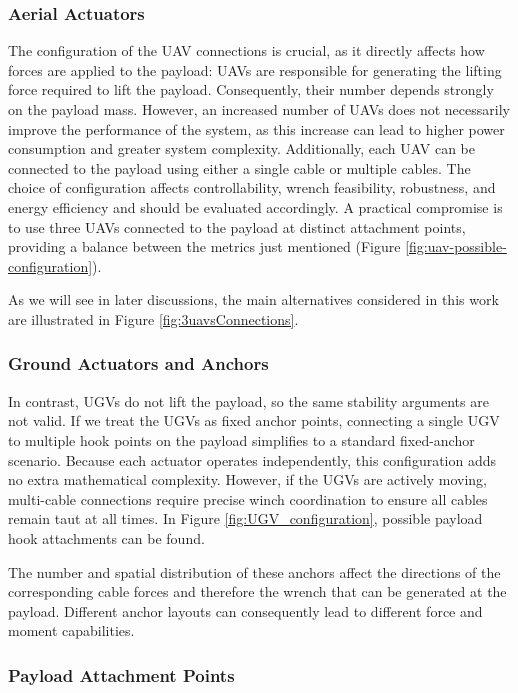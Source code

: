 \subsubsection{Aerial Actuators}

The configuration of the UAV connections is crucial, as it directly affects how forces are applied to the payload: UAVs are responsible for generating the lifting force required to lift the payload. Consequently, their number depends strongly on the payload mass. However, an increased number of UAVs does not necessarily improve the performance of the system, as this increase can lead to higher power consumption and greater system complexity. Additionally, each UAV can be connected to the payload using either a single cable or multiple cables. The choice of configuration affects controllability, wrench feasibility, robustness, and energy efficiency and should be evaluated accordingly. A practical compromise is to use three UAVs connected to the payload at distinct attachment points, providing a balance between the metrics just mentioned (Figure \ref{fig:uav-possible-configuration}). 

As we will see in later discussions, the main alternatives considered in this work are illustrated in Figure \ref{fig:3uavsConnections}. 


\subsubsection{Ground Actuators and Anchors}

In contrast, UGVs do not lift the payload, so the same stability arguments are not valid. If we treat the UGVs as fixed anchor points, connecting a single UGV to multiple hook points on the payload simplifies to a standard fixed-anchor scenario. Because each actuator operates independently, this configuration adds no extra mathematical complexity. However, if the UGVs are actively moving, multi-cable connections require precise winch coordination to ensure all cables remain taut at all times. In Figure \ref{fig:UGV_configuration}, possible payload hook attachments can be found.

The number and spatial distribution of these anchors affect the directions of the corresponding cable forces and therefore the wrench that can be generated at the payload. Different anchor layouts can consequently lead to different force and moment capabilities.

\subsubsection{Payload Attachment Points}

